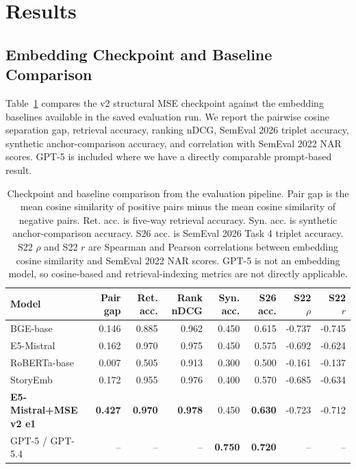 \section{Results}

\subsection{Embedding Checkpoint and Baseline Comparison}

Table~\ref{tab:embedding-baseline-comparison} compares the v2 structural MSE checkpoint against the embedding baselines available in the saved evaluation run. We report the pairwise cosine separation gap, retrieval accuracy, ranking nDCG, SemEval 2026 triplet accuracy, synthetic anchor-comparison accuracy, and correlation with SemEval 2022 NAR scores. GPT-5 is included where we have a directly comparable prompt-based result.

\begin{table}[t]
\centering
\small
\begin{tabular}{lrrrrrrr}
\toprule
Model & Pair gap & Ret. acc. & Rank nDCG & Syn. acc. & S26 acc. & S22 $\rho$ & S22 $r$ \\
\midrule
BGE-base & 0.146 & 0.885 & 0.962 & 0.450 & 0.615 & -0.737 & -0.745 \\
E5-Mistral & 0.162 & 0.970 & 0.975 & 0.450 & 0.575 & -0.692 & -0.624 \\
RoBERTa-base & 0.007 & 0.505 & 0.913 & 0.300 & 0.500 & -0.161 & -0.137 \\
StoryEmb & 0.172 & 0.955 & 0.976 & 0.400 & 0.570 & -0.685 & -0.634 \\
\textbf{E5-Mistral+MSE v2 e1} & \textbf{0.427} & \textbf{0.970} & \textbf{0.978} & 0.450 & \textbf{0.630} & -0.723 & -0.712 \\
GPT-5 / GPT-5.4 & -- & -- & -- & \textbf{0.750} & \textbf{0.720} & -- & -- \\
\bottomrule
\end{tabular}
\caption{Checkpoint and baseline comparison from the evaluation pipeline. Pair gap is the mean cosine similarity of positive pairs minus the mean cosine similarity of negative pairs. Ret. acc. is five-way retrieval accuracy. Syn. acc. is synthetic anchor-comparison accuracy. S26 acc. is SemEval 2026 Task 4 triplet accuracy. S22 $\rho$ and S22 $r$ are Spearman and Pearson correlations between embedding cosine similarity and SemEval 2022 NAR scores. GPT-5 is not an embedding model, so cosine-based and retrieval-indexing metrics are not directly applicable.}
\label{tab:embedding-baseline-comparison}
\end{table}

